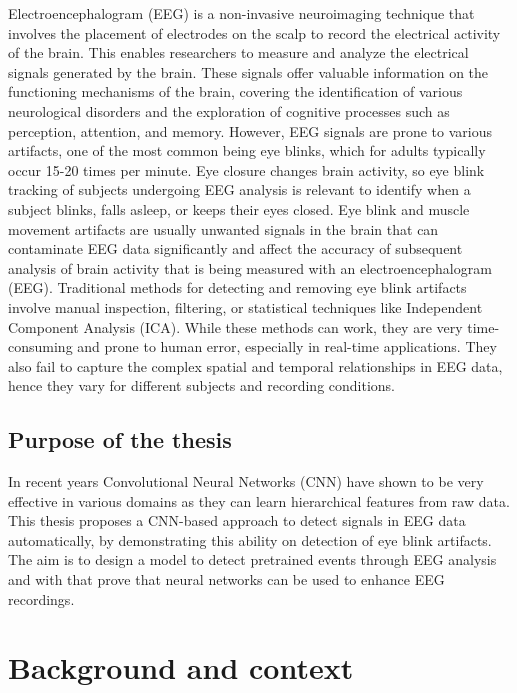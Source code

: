 \documentclass[12pt,a4paper,titlepage,openany]{report}
\begin{document}
Electroencephalogram (EEG) is a non-invasive neuroimaging technique that involves the placement of electrodes on the scalp to record the electrical activity of the brain\cite{islam2023}. This enables researchers to measure and analyze the electrical signals generated by the brain. These signals offer valuable information on the functioning mechanisms of the brain, covering the identification of various neurological disorders and the exploration of cognitive processes such as perception, attention, and memory.
However, EEG signals are prone to various artifacts, one of the most common being eye blinks, which for adults typically occur 15-20 times per minute. Eye closure changes brain activity, so eye blink tracking of subjects undergoing EEG analysis is relevant to identify when a subject blinks, falls asleep, or keeps their eyes closed. 
Eye blink and muscle movement artifacts are usually unwanted signals in the brain that can contaminate EEG data significantly and affect the accuracy of subsequent analysis of brain activity that is being measured with an electroencephalogram (EEG). 
Traditional methods for detecting and removing eye blink artifacts involve manual inspection, filtering, or statistical techniques like Independent Component Analysis (ICA). While these methods can work, they are very time-consuming and prone to human error, especially in real-time applications. They also fail to capture the complex spatial and temporal relationships in EEG data, hence they vary for different subjects and recording conditions.

\section{Purpose of the thesis}

In recent years Convolutional Neural Networks (CNN) have shown to be very effective in various domains as they can learn hierarchical features from raw data. 
This thesis proposes a CNN-based approach to detect signals in EEG data automatically, by demonstrating this ability on detection of eye blink artifacts. 
The aim is to design a model to detect pretrained events through EEG analysis and with that prove that neural networks can be used to enhance EEG recordings.


\chapter{Background and context}
\thispagestyle{fancy}
\end{document}
